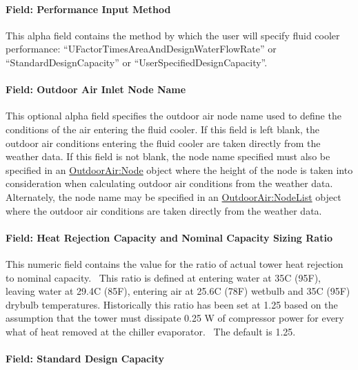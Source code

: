 \paragraph{Field: Performance Input Method}\label{field-performance-input-method-3}

This alpha field contains the method by which the user will specify fluid cooler performance: ``UFactorTimesAreaAndDesignWaterFlowRate'' or ``StandardDesignCapacity'' or ``UserSpecifiedDesignCapacity''.

\paragraph{Field: Outdoor Air Inlet Node Name}\label{field-outdoor-air-inlet-node-name-4}

This optional alpha field specifies the outdoor air node name used to define the conditions of the air entering the fluid cooler. If this field is left blank, the outdoor air conditions entering the fluid cooler are taken directly from the weather data. If this field is not blank, the node name specified must also be specified in an \hyperref[outdoorairnode]{OutdoorAir:Node} object where the height of the node is taken into consideration when calculating outdoor air conditions from the weather data. Alternately, the node name may be specified in an \hyperref[outdoorairnodelist]{\hyperref[outdoorairnode]{OutdoorAir:Node}List} object where the outdoor air conditions are taken directly from the weather data.

\paragraph{Field: Heat Rejection Capacity and Nominal Capacity Sizing Ratio}\label{field-heat-rejection-capacity-and-nominal-capacity-sizing-ratio-3}

This numeric field contains the value for the ratio of actual tower heat rejection to nominal capacity.~ This ratio is defined at entering water at 35C (95F), leaving water at 29.4C (85F), entering air at 25.6C (78F) wetbulb and 35C (95F) drybulb temperatures. Historically this ratio has been set at 1.25 based on the assumption that the tower must dissipate 0.25 W of compressor power for every what of heat removed at the chiller evaporator.~ The default is 1.25.

\paragraph{Field: Standard Design Capacity}\label{field-standard-design-capacity}

